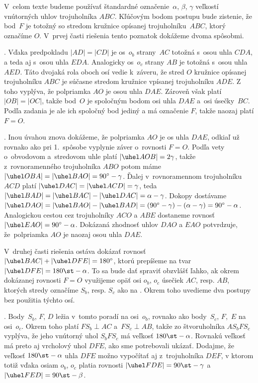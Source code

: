 {%
V~celom texte budeme používať štandardné označenie~$\alpha$,
$\beta$, $\gamma$ veľkostí vnútorných uhlov trojuholníka $ABC$.
Kľúčovým bodom postupu bude zistenie, že bod~$F$ je
totožný so stredom kružnice opísanej trojuholníku~$ABC$, ktorý označíme $O$.
V~prvej časti riešenia tento poznatok dokážeme dvoma spôsobmi.

\smallskip
{}. Vďaka predpokladu $|AD|=|CD|$ je os~$o_b$
strany~$AC$ totožná s~osou uhla $CDA$, a teda aj s~osou
uhla $EDA$. Analogicky os~$o_c$ strany $AB$
je totožná s~osou uhla $AED$. Táto dvojaká rola oboch osí vedie k~záveru,
že stred $O$ kružnice opísanej trojuholníku $ABC$ je
súčasne stredom kružnice vpísanej trojuholníku $ADE$. Z toho vyplýva,
že polpriamka $AO$ je osou uhla $DAE$. Zároveň však platí $|OB|=|OC|$,
takže bod~$O$ je spoločným bodom osi uhla $DAE$ a~osi úsečky~$BC$.
Podľa zadania je ale ich spoločný bod jediný a má označenie
$F$, takže naozaj platí $F=O$.

\smallskip
{}. Inou úvahou znova dokážeme, že polpriamka $AO$ je
os uhla $DAE$, odkiaľ už rovnako ako pri 1.~spôsobe vyplynie
záver o~rovnosti $F=O$. Podľa vety o~obvodovom a~stredovom uhle
platí $|\uhel AOB|=2\gamma$, takže z~rovnoramenného trojuholníka $ABO$
potom máme $|\uhel OBA|=|\uhel BAO|=90^\circ-\gamma$. Ďalej
v~rovnoramennom trojuholníku $ACD$ platí $|\uhel DAC|=|\uhel ACD|=\gamma$,
teda $|\uhel BAD|=|\uhel BAC|-|\uhel DAC|=\alpha-\gamma$.
Dokopy dostávame $|\uhel DAO|=|\uhel BAO|-|\uhel
BAD|=(90^\circ-\gamma)-(\alpha-\gamma)={90^\circ-\alpha}$.
Analogickou cestou cez trojuholníky $ACO$ a $ABE$ dostaneme rovnosť
$|\uhel EAO|={90^\circ-\alpha}$. Dokázaná zhodnosť uhlov $DAO$ a
$EAO$ potvrdzuje, že~polpriamka $AO$ je naozaj osou uhla $DAE$.
%

V~druhej časti riešenia ostáva dokázať rovnosť
$|\uhel BAC|+|\uhel DFE|=180^\circ$, ktorú prepíšeme na tvar
$|\uhel DFE|=180\st-\alpha$. To sa bude dať spraviť obzvlášť ľahko, ak
okrem dokázanej rovnosti $F=O$ využijeme opäť osi $o_b$, $o_c$ úsečiek
$AC$, resp. $AB$, ktorých stredy označíme $S_b$, resp. $S_c$
ako na \obr. Okrem toho uvedieme dva postupy bez použitia týchto
osí.

\smallskip
{}. Body~$S_b$, $F$, $D$ ležia v~tomto poradí
na osi~$o_b$, rovnako ako body~$S_c$, $F$,~$E$ na osi~$o_c$.
Okrem toho platí $FS_b \perp AC$ a~$FS_c \perp AB$,
takže zo štvoruholníka $AS_bFS_c$ vyplýva, že jeho vnútorný uhol
$S_bFS_c$ má veľkosť $180\st-\alpha$.
Rovnakú veľkosť má preto aj vrcholový uhol $DFE$, ako sme
potrebovali ukázať. Dodajme, že veľkosť $180\st-\alpha$ uhla $DFE$
možno vypočítať aj z~trojuholníka $DEF$,
v ktorom totiž vďaka osiam $o_b$, $o_c$ platia rovnosti
$|\uhel FDE|=90\st-\gamma$ a $|\uhel FED|=90\st-\beta$.

}
